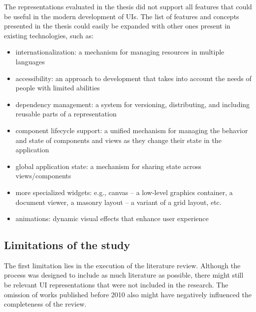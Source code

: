 The representations evaluated in the thesis did not support all features that could be useful in the modern development of UIs.
The list of features and concepts presented in the thesis could easily be expanded with other ones present in existing technologies, such as:
\begin{itemize}
    \item internationalization: a mechanism for managing resources in multiple languages
    \item accessibility: an approach to development that takes into account the needs of people with limited abilities
    \item dependency management: a system for versioning, distributing, and including reusable parts of a representation
    \item component lifecycle support: a unified mechanism for managing the behavior and state of components and views as they change their state in the application
    \item global application state: a mechanism for sharing state across views/components
    \item more specialized widgets: e.g., canvas -- a low-level graphics container, a document viewer, a masonry layout -- a variant of a grid layout, etc.
    \item animations: dynamic visual effects that enhance user experience
\end{itemize}

\subsection{Limitations of the study}\label{subsec:limitations-of-the-study}

The first limitation lies in the execution of the literature review.
Although the process was designed to include as much literature as possible, there might still be relevant UI representations that were not included in the research.
The omission of works published before 2010 also might have negatively influenced the completeness of the review.


